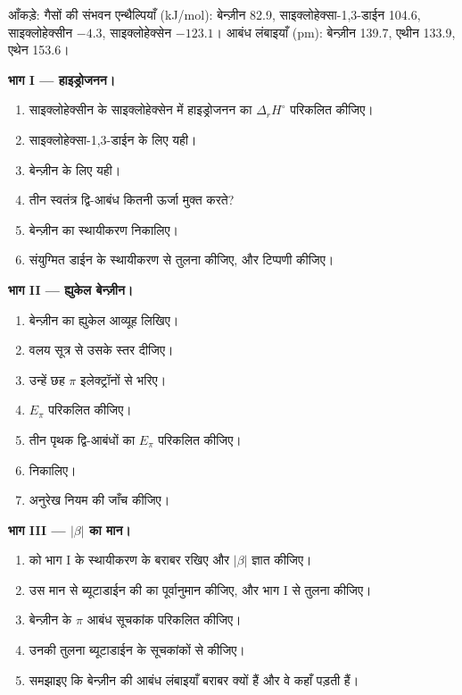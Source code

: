 \begin{problem}
\label{pb:b2:huckel:1}
आँकड़े: गैसों की संभवन एन्थैल्पियाँ (\unit{kJ/mol}): बेन्ज़ीन 82.9,
साइक्लोहेक्सा-1,3-डाईन 104.6, साइक्लोहेक्सीन $-4.3$, साइक्लोहेक्सेन $-123.1$। आबंध लंबाइयाँ
(pm): बेन्ज़ीन 139.7, एथीन 133.9, एथेन 153.6।

\medskip
\noindent\textbf{भाग I --- हाइड्रोजनन।}
\begin{enumerate}
  \item साइक्लोहेक्सीन के साइक्लोहेक्सेन में हाइड्रोजनन का $\Delta_r H^\circ$ परिकलित कीजिए।
  \item साइक्लोहेक्सा-1,3-डाईन के लिए यही।
  \item बेन्ज़ीन के लिए यही।
  \item तीन स्वतंत्र द्वि-आबंध कितनी ऊर्जा मुक्त करते?
  \item बेन्ज़ीन का स्थायीकरण निकालिए।
  \item संयुग्मित डाईन के स्थायीकरण से तुलना कीजिए, और टिप्पणी कीजिए।
\end{enumerate}

\medskip
\noindent\textbf{भाग II --- ह्युकेल बेन्ज़ीन।}
\begin{enumerate}[resume]
  \item बेन्ज़ीन का ह्युकेल आव्यूह लिखिए।
  \item वलय सूत्र से उसके स्तर दीजिए।
  \item उन्हें छह $\pi$ इलेक्ट्रॉनों से भरिए।
  \item $E_\pi$ परिकलित कीजिए।
  \item तीन पृथक द्वि-आबंधों का $E_\pi$ परिकलित कीजिए।
  \item {} निकालिए।
  \item अनुरेख नियम की जाँच कीजिए।
\end{enumerate}

\medskip
\noindent\textbf{भाग III --- $|\beta|$ का मान।}
\begin{enumerate}[resume]
  \item {} को भाग I के स्थायीकरण के बराबर रखिए और
        $|\beta|$ ज्ञात कीजिए।
  \item उस मान से ब्यूटाडाईन की  का पूर्वानुमान कीजिए, और
        भाग I से तुलना कीजिए।
  \item बेन्ज़ीन के $\pi$ आबंध सूचकांक परिकलित कीजिए।
  \item उनकी तुलना ब्यूटाडाईन के सूचकांकों से कीजिए।
  \item समझाइए कि बेन्ज़ीन की आबंध लंबाइयाँ बराबर क्यों हैं और वे कहाँ पड़ती हैं।
\end{enumerate}


\end{problem}

